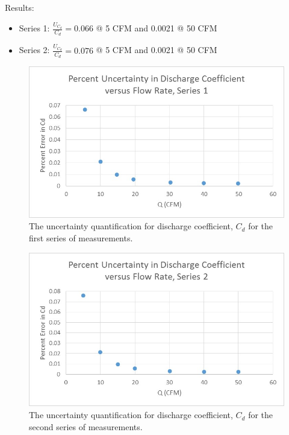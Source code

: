 \documentclass{article}
\begin{document}
Results: 
\begin{itemize}
\item Series 1: $\frac{U_{C_d}}{C_d} = 0.066$ @ 5 CFM and 0.0021 @ 50 CFM
\item Series 2: $\frac{U_{C_d}}{C_d} = 0.076$ @ 5 CFM and 0.0021 @ 50 CFM
\end{itemize}

  \begin{figure}[!htb]
   \begin{center}
    \includegraphics[width = 12 cm]{figs/PercentUncertaintyCdVsQ_Series1.jpg}
    \caption{The uncertainty quantification for discharge coefficient, $C_d$ for the first series of measurements.}
    \label{orif-s1}
   \end{center}
  \end{figure}

  \begin{figure}[!htb]
   \begin{center}
    \includegraphics[width = 12 cm]{figs/PercentUncertaintyCdVsQ_Series2.jpg}
    \caption{The uncertainty quantification for discharge coefficient, $C_d$ for the second series of measurements.}
    \label{orif-s2}
   \end{center}
  \end{figure}
\end{document}
